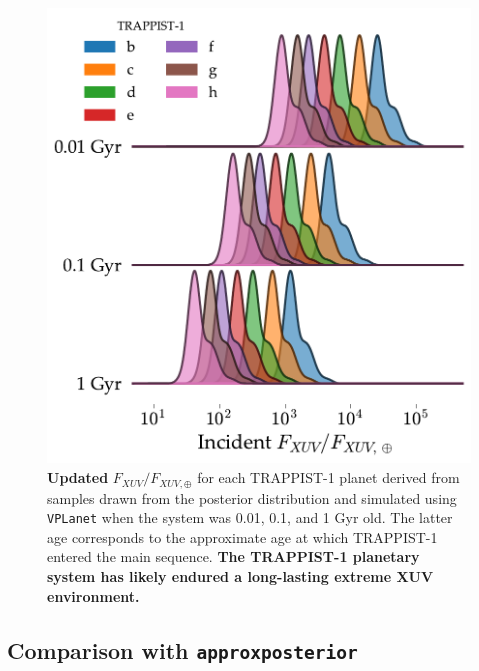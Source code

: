 \documentclass[twocolumn]{aastex62}
\newcommand{\xxx}[1]{{\textbf{#1}}}
\newcommand{\vplanet}[0]{\texttt{VPLanet}\xspace}
\newcommand{\approxposterior}[0]{\texttt{approxposterior}\xspace}
\begin{document}
\begin{figure}
	\includegraphics[width=0.98\columnwidth]{../Analysis/Fluxes/fluxes.pdf}
   \caption{\xxx{Updated} $F_{XUV}/F_{XUV,\oplus}$ for each TRAPPIST-1 planet derived from samples drawn from the posterior distribution and simulated using \vplanet when the system was 0.01, 0.1, and 1 Gyr old. The latter age corresponds to the approximate age at which TRAPPIST-1 entered the main sequence. \textbf{The TRAPPIST-1 planetary system has likely endured a long-lasting extreme XUV environment.}}%
    \label{fig:fluxes}%
\end{figure}


\subsection{Comparison with \approxposterior} \label{sec:approx}

\end{document}
